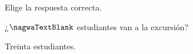 
\begin{question}

\begin{instance}
  
\begin{mcq}[standalone=false]
    
\begin{stem}
      Elige la respuesta correcta.\par      
\begin{enumerationnolabel}
\item{¿$\nagwaTextBlank$ estudiantes van a la excursión?}            
\item{Treinta estudiantes.}
\end{enumerationnolabel}
    
\end{stem}
    
\begin{distractors}
\end{distractors}
              
\end{mcq}

\end{instance}

\end{question}
